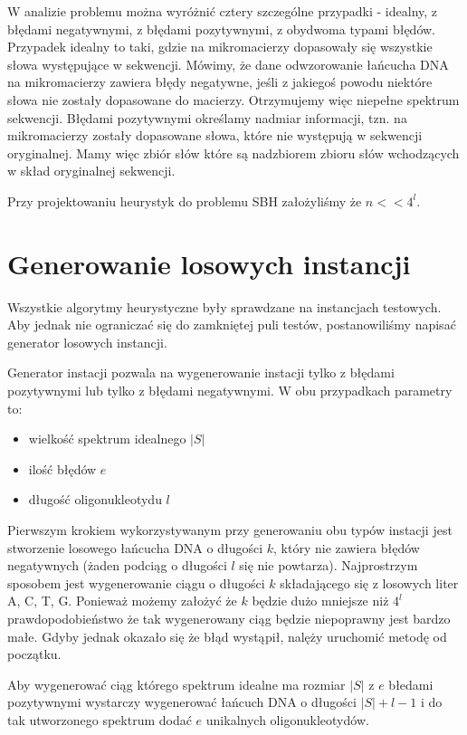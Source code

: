 \documentclass[a4paper,10pt]{article}
\begin{document}
W analizie problemu można wyróżnić cztery szczególne przypadki - idealny, z błędami negatywnymi, z błędami pozytywnymi, z obydwoma typami błędów.
Przypadek idealny to taki, gdzie na mikromacierzy dopasowały się wszystkie słowa występujące w sekwencji.
Mówimy, że dane odwzorowanie łańcucha DNA na mikromacierzy zawiera błędy negatywne, jeśli z jakiegoś powodu niektóre słowa nie
zostały dopasowane do macierzy. Otrzymujemy więc niepełne spektrum sekwencji.
Błędami pozytywnymi określamy nadmiar informacji, tzn. na mikromacierzy zostały dopasowane słowa, które nie występują w sekwencji
oryginalnej. Mamy więc zbiór słów które są nadzbiorem zbioru słów wchodzących w skład oryginalnej sekwencji.

Przy projektowaniu heurystyk do problemu SBH założyliśmy że $n << 4^l$.

\section{Generowanie losowych instancji}
Wszystkie algorytmy heurystyczne były sprawdzane na instancjach testowych. 
Aby jednak nie ograniczać się do zamkniętej puli testów, postanowiliśmy 
napisać generator losowych instancji. 

Generator instacji pozwala na wygenerowanie instacji tylko z błędami pozytywnymi
lub tylko z błędami negatywnymi. W obu przypadkach parametry to:
\begin{itemize}
 \item wielkość spektrum idealnego $|S|$
 \item ilość błędów $e$
 \item długość oligonukleotydu $l$
\end{itemize}

Pierwszym krokiem wykorzystywanym przy generowaniu obu typów instacji jest stworzenie
losowego łańcucha DNA o długości $k$, który nie zawiera błędów negatywnych (żaden 
podciąg o długości $l$ się nie powtarza). Najprostrzym sposobem jest wygenerowanie 
ciągu o długości $k$ składającego się z losowych liter A, C, T, G. Ponieważ możemy 
założyć że $k$ będzie dużo mniejsze niż $4^l$ prawdopodobieństwo że tak wygenerowany
ciąg będzie niepoprawny jest bardzo małe. Gdyby jednak okazało się że błąd wystąpił,
nalęży uruchomić metodę od początku.

Aby wygenerować ciąg którego spektrum idealne ma rozmiar $|S|$ z $e$ błedami pozytywnymi
wystarczy wygenerować łańcuch DNA o długości $|S|+l-1$ i do tak utworzonego spektrum 
dodać $e$ unikalnych oligonukleotydów.
\end{document}
